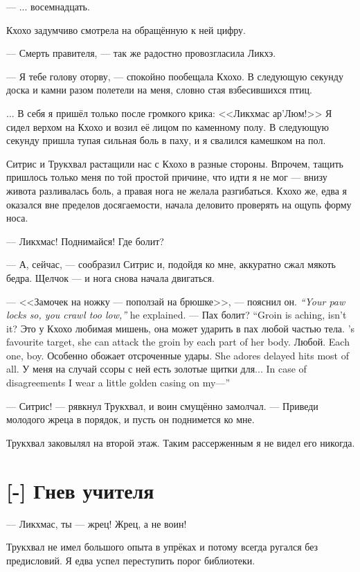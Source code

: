 --- ... восемнадцать.

Кхохо задумчиво смотрела на обращённую к ней цифру.

--- Смерть правителя, --- так же радостно провозгласила Ликхэ.

--- Я тебе голову оторву, --- спокойно пообещала Кхохо.
В следующую секунду доска и камни разом полетели на меня, словно стая взбесившихся птиц.

... В себя я пришёл только после громкого крика: <<Ликхмас ар’Люм!>>
Я сидел верхом на Кхохо и возил её лицом по каменному полу.
В следующую секунду пришла тупая сильная боль в паху, и я свалился камешком на пол.

Ситрис и Трукхвал растащили нас с Кхохо в разные стороны.
Впрочем, тащить пришлось только меня по той простой причине, что идти я не мог --- внизу живота разливалась боль, а правая нога не желала разгибаться.
Кхохо же, едва я оказался вне пределов досягаемости, начала деловито проверять на ощупь форму носа.

--- Ликхмас!
Поднимайся!
Где болит?

--- А, сейчас, --- сообразил Ситрис и, подойдя ко мне, аккуратно сжал мякоть бедра.
Щелчок --- и нога снова начала двигаться.

{--- <<Замочек на ножку --- поползай на брюшке>>, --- пояснил он.}
{\emph{``Your paw locks so, you crawl too low,''} he explained.}
{--- Пах болит?}
{``Groin is aching, isn't it?}
{Это у Кхохо любимая мишень, она может ударить в пах любой частью тела.}
{\Kchoho's favourite target, she can attack the groin by each part of her body.}
{Любой.}
{Each one, boy.}
{Особенно обожает отсроченные удары.}
{She adores delayed hits most of all.}
{У меня на случай ссоры с ней есть золотые щитки для...}
{In case of disagreements I wear a little golden casing on my---''}

--- Ситрис! --- рявкнул Трукхвал, и воин смущённо замолчал.
--- Приведи молодого жреца в порядок, и пусть он поднимется ко мне.

Трукхвал заковылял на второй этаж.
Таким рассерженным я не видел его никогда.

\section{[-] Гнев учителя}

--- Ликхмас, ты --- жрец!
Жрец, а не воин!

Трукхвал не имел большого опыта в упрёках и потому всегда ругался без предисловий.
Я едва успел переступить порог библиотеки.

